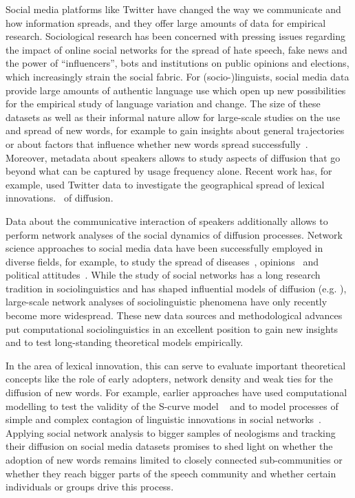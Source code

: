 \documentclass[a4paper, abstract=on]{scrartcl}
\begin{document}
  Social media platforms like Twitter have changed the way we communicate and how information spreads, and they offer large amounts of data for empirical research. Sociological research has been concerned with pressing issues regarding the impact of online social networks for the spread of hate speech, fake news and the power of \enquote{influencers}, bots and institutions on public opinions and elections, which increasingly strain the social fabric. For (socio-)linguists, social media data provide large amounts of authentic language use which open up new possibilities for the empirical study of language variation and change. The size of these datasets as well as their informal nature allow for large-scale studies on the use and spread of new words, for example to gain insights about general trajectories~\parencite{Nini2017} or about factors that influence whether new words spread successfully~\parencite{Grieve2018b}. Moreover, metadata about speakers allows to study aspects of diffusion that go beyond what can be captured by usage frequency alone. Recent work has, for example, used Twitter data to investigate the geographical spread of lexical innovations.~\parencite{Eisenstein2014,Grieve2017,Grieve2018} of diffusion.

  Data about the communicative interaction of speakers additionally allows to perform network analyses of the social dynamics of diffusion processes. Network science approaches to social media data have been successfully employed in diverse fields, for example, to study the spread of diseases~\parencite{Lu2018}, opinions~\parencite{West2014} and political attitudes~\parencite{Pew-Research-Center2019}. While the study of social networks has a long research tradition in sociolinguistics and has shaped influential models of diffusion (e.g. \cite{Milroy1985}), large-scale network analyses of sociolinguistic phenomena have only recently become more widespread. These new data sources and methodological advances put computational sociolinguistics in an excellent position to gain new insights and to test long-standing theoretical models empirically.

  In the area of lexical innovation, this can serve to evaluate important theoretical concepts like the role of early adopters, network density and weak ties for the diffusion of new words. For example, earlier approaches have used computational modelling to test the validity of the S-curve model ~\parencite{Blythe2012} and to model processes of simple and complex contagion of linguistic innovations in social networks~\parencite{Goel2016}. Applying social network analysis to bigger samples of neologisms and tracking their diffusion on social media datasets promises to shed light on whether the adoption of new words remains limited to closely connected sub-communities or whether they reach bigger parts of the speech community and whether certain individuals or groups drive this process.
\end{document}
